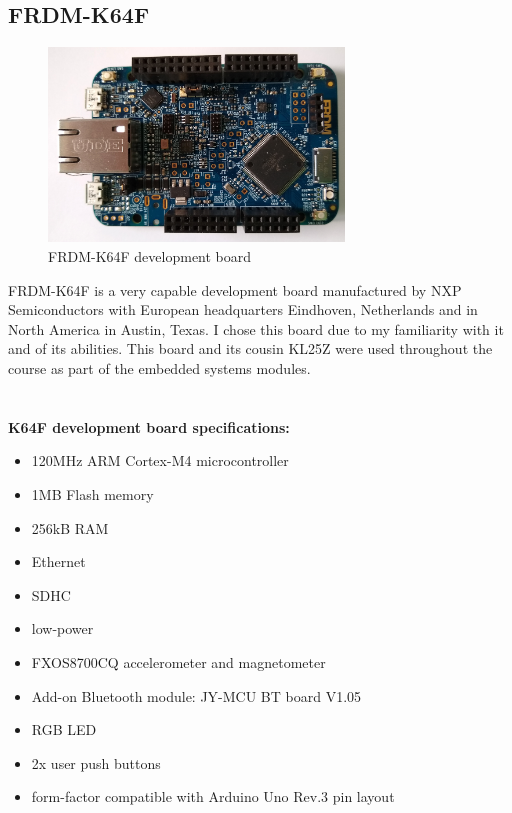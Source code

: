 \documentclass[12pt,a4paper]{article}
\begin{document}
		\subsection{FRDM-K64F}
		\begin{figure}[h]
			\centering
			\includegraphics[width=0.7\textwidth]{k64f1.jpg}\par\vspace{0cm}
			\caption{FRDM-K64F development board}
		\end{figure}
		FRDM-K64F is a very capable development board manufactured by NXP Semiconductors with
		European headquarters Eindhoven, Netherlands and in North America in Austin, Texas. I chose this board due to my familiarity with it and of its abilities. This board and its cousin KL25Z were used throughout the course as part of the embedded systems modules.\\\\\\
		{\bfseries K64F development board specifications:}  	
		\begin{itemize}[topsep=4pt,itemsep=1pt]
			\item 120MHz ARM Cortex-M4 microcontroller
			\item 1MB Flash memory
			\item 256kB RAM
			\item Ethernet
			\item SDHC
			\item low-power
			\item FXOS8700CQ accelerometer and magnetometer 
			\item Add-on Bluetooth module: JY-MCU BT board V1.05
			\item RGB LED
			\item 2x user push buttons
			\item form-factor compatible with Arduino Uno Rev.3 pin layout
		\end{itemize}
		
\end{document}
